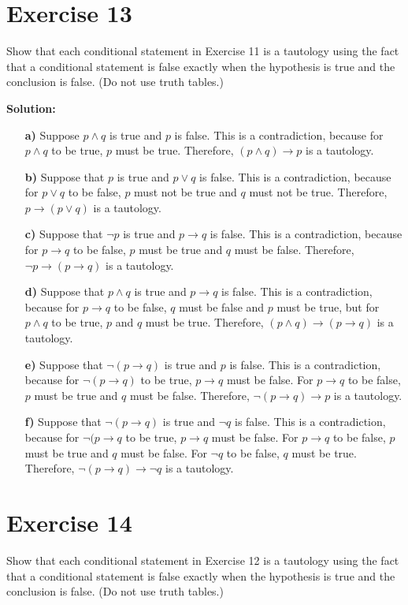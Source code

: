 \documentclass{Axon}
\begin{document}
\section*{Exercise 13}
Show that each conditional statement in Exercise 11 is a tautology using the fact that a conditional statement is false exactly when the hypothesis is true and the conclusion is false. (Do not use truth tables.)

\noindent
\textbf{Solution:}
\begin{enumerate}
    \item[\textbf{a)}] Suppose \(p \land q\) is true and \(p\) is false. This is a contradiction, because for \(p \land q\) to be true, \(p\) must be true. Therefore, \((p \land q) \to p\) is a tautology.
    \item[\textbf{b)}] Suppose that \(p\) is true and \(p \lor q\) is false. This is a contradiction, because for \(p \lor q\) to be false, \(p\) must not be true and \(q\) must not be true. Therefore, \(p \to (p \lor q)\) is a tautology.
    \item[\textbf{c)}] Suppose that \(\lnot p\) is true and \(p \to q\) is false. This is a contradiction, because for \(p \to q\) to be false, \(p\) must be true and \(q\) must be false. Therefore, \(\lnot p \to (p \to q)\) is a tautology.
    \item[\textbf{d)}] Suppose that \(p \land q\) is true and \(p \to q\) is false. This is a contradiction, because for \(p \to q\) to be false, \(q\) must be false and \(p\) must be true, but for \(p \land q\) to be true, \(p\) and \(q\) must be true. Therefore, \((p \land q) \to (p \to q)\) is a tautology.
    \item[\textbf{e)}] Suppose that \(\lnot(p \to q)\) is true and \(p\) is false. This is a contradiction, because for \(\lnot(p \to q)\) to be true, \(p \to q\) must be false. For \(p \to q\) to be false, \(p\) must be true and \(q\) must be false. Therefore, \(\lnot(p \to q) \to p\) is a tautology.
    \item[\textbf{f)}] Suppose that \(\lnot(p \to q)\) is true and \(\lnot q\) is false. This is a contradiction, because for \(\lnot(p \to q\) to be true, \(p \to q\) must be false. For \(p \to q\) to be false, \(p\) must be true and \(q\) must be false. For \(\lnot q\) to be false, \(q\) must be true. Therefore, \(\lnot(p \to q) \to \lnot q\) is a tautology.
\end{enumerate}

\section*{Exercise 14}
Show that each conditional statement in Exercise 12 is a tautology using the fact that a conditional statement is false exactly when the hypothesis is true and the conclusion is false. (Do not use truth tables.)
\end{document}
